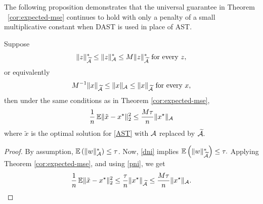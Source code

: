 The following proposition demonstrates that the universal guarantee in Theorem
~\ref{cor:expected-mse} continues to hold with only a penalty of a small
multiplicative constant when DAST is used in place of AST.
\begin{prop}\label{prop:grid-approx-mse}
Suppose 
\begin{equation}
  \label{dni}
  \lVert z\rVert_{\widetilde{\mathcal{A}}}^* \leq \lVert z\rVert_{\mathcal{A}}^* \leq 
  M\lVert z\rVert_{\widetilde{\mathcal{A}}}^* \text{ for every } z,
\end{equation}
or equivalently 
\begin{equation}
  \label{pni}
  M^{-1}\lVert x\rVert_{\widetilde{\mathcal{A}}} \leq \lVert x\rVert_{\mathcal{A}} \leq \lVert x\rVert_{\widetilde{\mathcal{A}}} \text{ for every } x,
\end{equation}
then under the same conditions as in Theorem \ref{cor:expected-mse},
\begin{equation*}
    \frac{1}{n} \operatorname{\mathbb{E}} \lVert\tilde{x} - x^\star\rVert_2^2 \leq \frac{M \tau}{n}\lVert x^\star\rVert_{\mathcal{A}}
\end{equation*}
where $\tilde{x}$ is the optimal solution for \eqref{AST} with $\mathcal{A}$ replaced by $\widetilde{\mathcal{A}}.$
\end{prop}
\begin{proof}\belowdisplayskip=-12pt
By assumption, $\operatorname{\mathbb{E}}\left(\lVert w\rVert_{\mathcal{A}}^*\right) \leq \tau$. Now, \eqref{dni}
implies $\operatorname{\mathbb{E}}\left(\lVert w\rVert_{\widetilde{\mathcal{A}}}^*\right) \leq \tau.$ Applying
Theorem \ref{cor:expected-mse}, and using \eqref{pni}, we get
\begin{equation*}
\frac{1}{n} \operatorname{\mathbb{E}} \lVert\tilde{x} - x^\star\rVert_2^2 \leq \frac{\tau}{n}\lVert x^\star\rVert_{\widetilde{\mathcal{A}}} \leq \frac{M \tau}{n}\lVert x^\star\rVert_{\mathcal{A}}.
\end{equation*}
\end{proof}

% 

